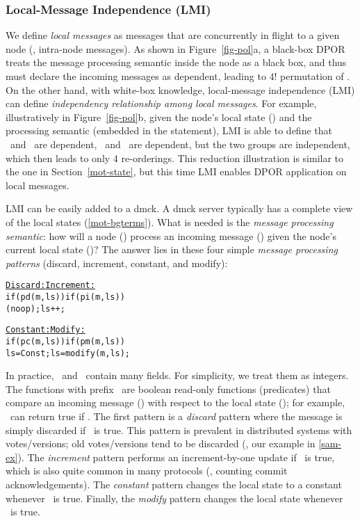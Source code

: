 
\subsubsection{Local-Message Independence (LMI)}
\label{sam-lmi}

We define {\em local messages} as messages that are concurrently in
flight to a given node (\ie, intra-node messages).  As shown in
Figure~\ref{fig-pol}a, a black-box DPOR treats the message processing
semantic inside the node as a black box, and thus must declare the
incoming messages as dependent, leading to 4! permutation
of \ma\mb\mc\md.  On the other hand, with white-box knowledge,
local-message independence (LMI) can define {\em independency
relationship among local messages}.  For example, illustratively in
Figure~\ref{fig-pol}b, given the node's local state (\ls) and the
processing semantic (embedded in the  statement), LMI is able
to define that \ma\ and \mb\ are dependent, \mc\ and \md\ are
dependent, but the two groups are independent, which then leads to
only 4 re-orderings.  This reduction illustration is similar to the
one in Section~\ref{mot-state}, but this time LMI enables DPOR
application on local messages.


LMI can be easily added to a dmck.  A dmck server typically has a
complete view of the local states (\sec\ref{mot-bgterms}).  What is
needed is the {\em message processing semantic}: how will a node (\nn)
process an incoming message (\mm) given the node's current local state
(\ls)?  The answer lies in these four simple {\em message processing
patterns} (discard, increment, constant, and modify):


{\small
\begin{alltt}
     \underline{Discard:}           \underline{Increment:}  
     if (pd(m,ls))      if (pi(m,ls))
      (noop);             ls++;       

     \underline{Constant:}          \underline{Modify:}  
     if (pc(m,ls))      if (pm(m,ls))
       ls = Const;        ls = modify(m,ls);
\end{alltt}
}

In practice, \ls\ and \mm\ contain many fields.  For simplicity, we
treat them as integers.  The functions with prefix \pp\ are boolean
read-only functions (predicates) that compare an incoming message
(\mm) with respect to the local state (\ls); for example, \pd\ can
return true if .  The first pattern is a {\em discard} pattern
where the message is simply discarded if \pd\ is true.  This pattern
is prevalent in distributed systems with votes/versions; old
votes/versions tend to be discarded (\eg, our example
in \sec\ref{sam-ex}).  The {\em increment} pattern performs an
increment-by-one update if \pi\ is true, which is also quite common in
many protocols (\eg, counting commit acknowledgements).  The {\em
constant} pattern changes the local state to a constant whenever \pc\
is true.  Finally, the {\em modify} pattern changes the local state
whenever \pm\ is true.


